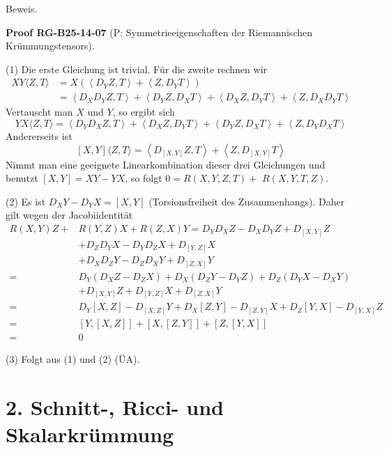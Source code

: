 \documentclass[10pt, letterpaper]{article}
\newcommand{\CustomHeading}[3]{%
  \par\medskip\noindent%
  \textbf{#1 #2} \textnormal{(#3)}.\enskip%
}
\newenvironment{PROOF}[2]{\begin{unitbox}\CustomHeading{Proof}{#1}{#2}}{\end{unitbox}}
\begin{document}
Beweis. 

\begin{PROOF}{RG-B25-14-07}{P: Symmetrieeigenschaften der Riemannischen Krümmungstensors}
(1) Die erste Gleichung ist trivial. Für die zweite rechnen wir
$$
\begin{aligned}
X Y\langle Z, T\rangle & =X\left(\left\langle D_{Y} Z, T\right\rangle+\left\langle Z, D_{Y} T\right\rangle\right) \\
& =\left\langle D_{X} D_{Y} Z, T\right\rangle+\left\langle D_{Y} Z, D_{X} T\right\rangle+\left\langle D_{X} Z, D_{Y} T\right\rangle+\left\langle Z, D_{X} D_{Y} T\right\rangle
\end{aligned}
$$
Vertauscht man $X$ und $Y$, so ergibt sich 
$$Y X\langle Z, T\rangle=\left\langle D_{Y} D_{X} Z, T\right\rangle+\left\langle D_{X} Z, D_{Y} T\right\rangle+\left\langle D_{Y} Z, D_{X} T\right\rangle+\left\langle Z, D_{Y} D_{X} T\right\rangle$$
Andererseits ist
$$
[X, Y]\langle Z, T\rangle=\left\langle D_{[X, Y]} Z, T\right\rangle+\left\langle Z, D_{[X, Y]} T\right\rangle
$$
Nimmt man eine geeignete Linearkombination dieser drei Gleichungen und benutzt $[X, Y]=X Y-Y X$, so folgt $0=R(X, Y, Z, T)+$ $R(X, Y, T, Z)$.


(2) Es ist $D_{X} Y-D_{Y} X=[X, Y]$ (Torsionsfreiheit des Zusammenhangs). Daher gilt wegen der Jacobiidentität
$$
\begin{aligned}
R(X, Y) Z+ & R(Y, Z) X+R(Z, X) Y=D_{Y} D_{X} Z-D_{X} D_{Y} Z+D_{[X, Y]} Z \\
& +D_{Z} D_{Y} X-D_{Y} D_{Z} X+D_{[Y, Z]} X \\
& +D_{X} D_{Z} Y-D_{Z} D_{X} Y+D_{[Z, X]} Y \\
= & D_{Y}\left(D_{X} Z-D_{Z} X\right)+D_{X}\left(D_{Z} Y-D_{Y} Z\right)+D_{Z}\left(D_{Y} X-D_{X} Y\right) \\
& +D_{[X, Y]} Z+D_{[Y, Z]} X+D_{[Z, X]} Y \\
= & D_{Y}[X, Z]-D_{[X, Z]} Y+D_{X}[Z, Y]-D_{[Z, Y]} X+D_{Z}[Y, X]-D_{[Y, X]} Z \\
= & {[Y,[X, Z]]+[X,[Z, Y]]+[Z,[Y, X]] } \\
= & 0
\end{aligned}
$$


(3) Folgt aus (1) und (2) (ÜA).
\end{PROOF}



\section*{2. Schnitt-, Ricci- und Skalarkrümmung}
\end{document}
